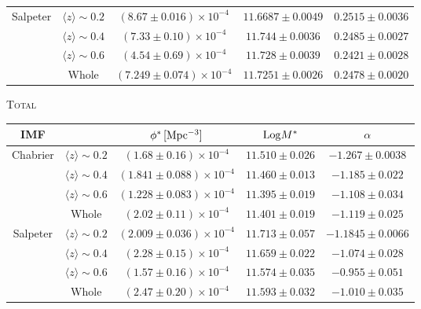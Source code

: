 {\begin{table}
\begin{tabular}{c|cccc}
\hline
Salpeter &$\langle z \rangle \sim 0.2$ & $(8.67 \pm 0.016)\times 10^{-4}$&$11.6687 \pm 0.0049$ & $0.2515\pm 0.0036$  \\%
& $\langle z \rangle \sim 0.4$ & $(7.33 \pm0.10)\times 10^{-4}$ &$11.744\pm 0.0036 $ &  $0.2485 \pm 0.0027$ \\%
& $\langle z \rangle \sim 0.6$ & $(4.54 \pm0.69)\times 10^{-4}$ &$11.728\pm 0.0039 $ &  $0.2421 \pm 0.0028$ \\%
& Whole  &$(7.249 \pm 0.074)\times 10^{-4}$& $11.7251\pm 0.0026 $ &  $0.2478  \pm 0.0020 $\\%
\end{tabular}
\vspace{0.1cm}
\begin{center}\textsc{Total}\end{center}
\begin{tabular}{c|cccc}
\hline
\hline
IMF &&$\phi^*\, {\rm [Mpc^{-3}]}$&${\rm Log} M^*$&$\alpha$\\ %
\hline
Chabrier &$\langle z \rangle \sim 0.2$ & $(1.68 \pm 0.16)\times 10^{-4}$&$11.510 \pm 0.026$ & $-1.267\pm 0.0038$\\%
& $\langle z \rangle \sim 0.4$ & $(1.841 \pm 0.088)\times 10^{-4}$ &$11.460\pm 0.013 $ &  $-1.185 \pm 0.022$\\%
& $\langle z \rangle \sim 0.6$ & $(1.228 \pm 0.083) \times 10^{-4}$ &$11.395\pm 0.019 $ &  $-1.108 \pm 0.034$\\%
& Whole & $(2.02 \pm 0.11) \times 10^{-4}$ &$11.401\pm 0.019 $ &  $-1.119 \pm 0.025$\\%
\hline
Salpeter &$\langle z \rangle \sim 0.2$ & $(2.009 \pm 0.036)\times 10^{-4}$&$11.713 \pm 0.057$ & $-1.1845\pm 0.0066$\\%
& $\langle z \rangle \sim 0.4$ & $(2.28 \pm 0.15)\times 10^{-4}$ &$11.659\pm 0.022 $ &  $-1.074 \pm 0.028$\\%
& $\langle z \rangle \sim 0.6$ & $(1.57 \pm 0.16) \times 10^{-4}$ &$11.574\pm 0.035 $ &  $-0.955 \pm 0.051$ \\%
& Whole & $(2.47 \pm 0.20) \times 10^{-4}$ &$11.593\pm 0.032 $ &  $-1.010 \pm 0.035$\\%


\end{tabular}
\end{table}}
